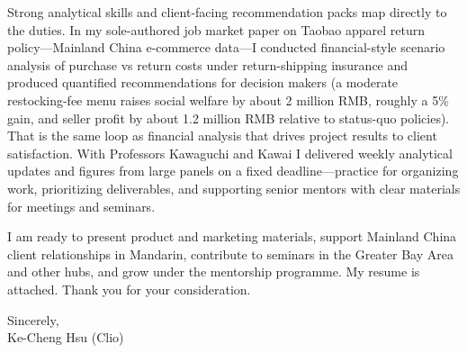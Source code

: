 \documentclass[11pt,letterpaper]{article}
\begin{document}
Strong analytical skills and client-facing recommendation packs map directly to the duties. In my sole-authored job market paper on Taobao apparel return policy---Mainland China e-commerce data---I conducted financial-style scenario analysis of purchase vs return costs under return-shipping insurance and produced quantified recommendations for decision makers (a moderate restocking-fee menu raises social welfare by about 2 million RMB, roughly a 5\% gain, and seller profit by about 1.2 million RMB relative to status-quo policies). That is the same loop as financial analysis that drives project results to client satisfaction. With Professors Kawaguchi and Kawai I delivered weekly analytical updates and figures from large panels on a fixed deadline---practice for organizing work, prioritizing deliverables, and supporting senior mentors with clear materials for meetings and seminars.

I am ready to present product and marketing materials, support Mainland China client relationships in Mandarin, contribute to seminars in the Greater Bay Area and other hubs, and grow under the mentorship programme. My resume is attached. Thank you for your consideration.

\vspace{0.3em}
Sincerely,\\[0.25em]
Ke-Cheng Hsu (Clio)
\end{document}
